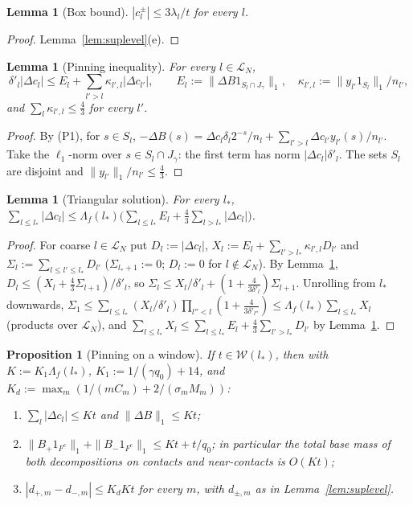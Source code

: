 \documentclass[10pt]{amsart}
\newtheorem{lemma}[theorem]{Lemma}
\newtheorem{proposition}[theorem]{Proposition}
\theoremstyle{definition}
\theoremstyle{remark}
\begin{document}
\begin{lemma}[Box bound]\label{lem:box}
$|c^\pm_l|\le3\lambda_l/t$ for every $l$.
\end{lemma}

\begin{proof}
Lemma~\ref{lem:suplevel}(e).
\end{proof}

\begin{lemma}[Pinning inequality]\label{lem:pinning}
For every $l\in\mathcal L_N$,
\[
 \delta'_l|\Delta c_l|\le E_l+\sum_{l'>l}\kappa_{l',l}|\Delta c_{l'}|,\qquad
 E_l:=\|\Delta B1_{S_l\cap J_\gamma}\|_1,\quad\kappa_{l',l}:=
 \|y_{l'}1_{S_l}\|_1/n_{l'},
\]
and $\sum_l\kappa_{l',l}\le\frac43$ for every $l'$.
\end{lemma}

\begin{proof}
By (P1), for $s\in S_l$,
$-\Delta B(s)=\Delta c_l\delta_l2^{-s}/n_l+\sum_{l'>l}\Delta c_{l'}y_{l'}(s)/
n_{l'}$.  Take the $\ell_1$-norm over $s\in S_l\cap J_\gamma$: the first term
has norm $|\Delta c_l|\delta'_l$.  The sets $S_l$ are disjoint and
$\|y_{l'}\|_1/n_{l'}\le\frac43$.
\end{proof}

\begin{lemma}[Triangular solution]\label{lem:triangular}
For every $l_*$,
$\displaystyle\sum_{l\le l_*}|\Delta c_l|\le\Lambda_f(l_*)\Big(\sum_{l\le
l_*}E_l+\frac43\sum_{l>l_*}|\Delta c_l|\Big)$.
\end{lemma}

\begin{proof}
For coarse $l\in\mathcal L_N$ put $D_l:=|\Delta c_l|$, $X_l:=E_l+
\sum_{l'>l_*}\kappa_{l',l}D_{l'}$ and $\Sigma_l:=\sum_{l\le l'\le l_*}D_{l'}$
($\Sigma_{l_*+1}:=0$; $D_l:=0$ for $l\notin\mathcal L_N$).  By
Lemma~\ref{lem:pinning}, $D_l\le(X_l+\frac43\Sigma_{l+1})/\delta'_l$, so
$\Sigma_l\le X_l/\delta'_l+(1+\frac4{3\delta'_l})\Sigma_{l+1}$.  Unrolling
from $l_*$ downwards, $\Sigma_1\le\sum_{l\le l_*}(X_l/\delta'_l)\prod_{l''<l}
(1+\frac4{3\delta'_{l''}})\le\Lambda_f(l_*)\sum_{l\le l_*}X_l$ (products over
$\mathcal L_N$), and $\sum_{l\le l_*}X_l\le\sum_{l\le l_*}E_l+\frac43
\sum_{l'>l_*}D_{l'}$ by Lemma~\ref{lem:pinning}.
\end{proof}

\begin{proposition}[Pinning on a window]\label{prop:pinned}
If $t\in\mathcal W(l_*)$, then with $K:=K_1\Lambda_f(l_*)$,
$K_1:=1/(\gamma q_0)+14$, and $K_d:=\max_m(1/(mC_m)+2/(\sigma_mM_m))$:
\begin{enumerate}
\item[(a)] $\sum_l|\Delta c_l|\le Kt$ and $\|\Delta B\|_1\le Kt$;
\item[(b)] $\|B_+1_{F^c}\|_1+\|B_-1_{F^c}\|_1\le Kt+t/q_0$; in particular the
total base mass of both decompositions on contacts and near-contacts is
$O(Kt)$;
\item[(c)] $|d_{+,m}-d_{-,m}|\le K_dKt$ for every $m$, with $d_{\pm,m}$ as in
Lemma~\ref{lem:suplevel}.
\end{enumerate}
\end{proposition}
\end{document}
